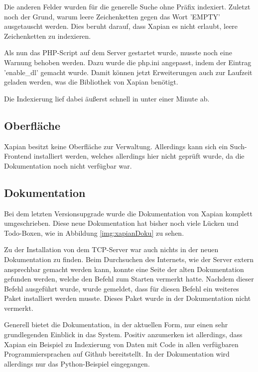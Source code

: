 Die anderen Felder wurden für die generelle Suche ohne Präfix indexiert. Zuletzt noch der Grund, warum leere Zeichenketten gegen das Wort 'EMPTY' ausgetauscht werden. Dies beruht darauf, dass Xapian es nicht erlaubt, leere Zeichenketten zu indexieren.

Als nun das PHP-Script auf dem Server gestartet wurde, musste noch eine Warnung behoben werden. Dazu wurde die php.ini angepasst, indem der Eintrag 'enable\_dl' gemacht wurde. Damit können jetzt Erweiterungen auch zur Laufzeit geladen werden, was die Bibliothek von Xapian benötigt. 

Die Indexierung lief dabei äußerst schnell in unter einer Minute ab. \cite{Xapian.21.1.2020}

\subsection{Oberfläche}

Xapian besitzt keine Oberfläche zur Verwaltung. Allerdings kann sich ein Such-Frontend installiert werden, welches allerdings hier nicht geprüft wurde, da die Dokumentation noch nicht verfügbar war.

\subsection{Dokumentation}

Bei dem letzten Versionsupgrade wurde die Dokumentation von Xapian komplett umgeschrieben. Diese neue Dokumentation hat bisher noch viele Lücken und Todo-Boxen, wie in Abbildung \ref{img:xapianDoku} zu sehen.

Zu der Installation von dem TCP-Server war auch nichts in der neuen Dokumentation zu finden. Beim Durchsuchen des Internets, wie der Server extern ansprechbar gemacht werden kann, konnte eine Seite der alten Dokumentation gefunden werden, welche den Befehl zum Starten vermerkt hatte. Nachdem dieser Befehl ausgeführt wurde, wurde gemeldet, dass für diesen Befehl ein weiteres Paket installiert werden musste. Dieses Paket wurde in der Dokumentation nicht vermerkt. 

Generell bietet die Dokumentation, in der aktuellen Form, nur einen sehr grundlegenden Einblick in das System. Positiv anzumerken ist allerdings, dass Xapian ein Beispiel zu Indexierung von Daten mit Code in allen verfügbaren Programmiersprachen auf Github bereitstellt. \cite{Xapian.25.2.2020} In der Dokumentation wird allerdings nur das Python-Beispiel eingegangen.

